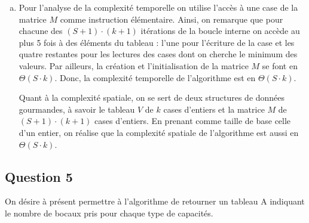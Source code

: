 \documentclass[12pt,a4paper]{article}
\begin{document}
\begin{enumerate}[a)]
 \item Pour l'analyse de la complexit\'e temporelle on utilise l'acc\`es \`a une case de la matrice $M$ comme instruction \'el\'ementaire. Ainsi, on remarque que pour chacune des $(S+1)\cdot (k+1)$ it\'erations de la boucle interne on acc\`ede au plus 5 fois \`a des \'el\'ements du tableau : l'une pour l'\'ecriture de la case et les quatre restantes pour les lectures des cases dont on cherche le minimum des valeurs. Par ailleurs, la cr\'eation et l'initialisation de la matrice $M$ se font en $\Theta(S\cdot k)$.
Donc, la complexit\'e temporelle de l'algorithme est en $\Theta(S\cdot k)$.

Quant \`a la complexit\'e spatiale, on se sert de deux structures de donn\'ees gourmandes, \`a savoir le tableau $V$ de $k$ cases d'entiers et la matrice $M$ de $(S+1)\cdot (k+1)$ cases d'entiers. En prenant comme taille de base celle d'un entier, on r\'ealise que la complexit\'e spatiale de l'algorithme est aussi en $\Theta(S\cdot k)$.
\end{enumerate}

\subsection*{Question 5}
On d\'esire \`a pr\'esent permettre \`a l'algorithme de retourner un tableau A indiquant le nombre de bocaux pris pour chaque type de capacit\'es.
\end{document}
